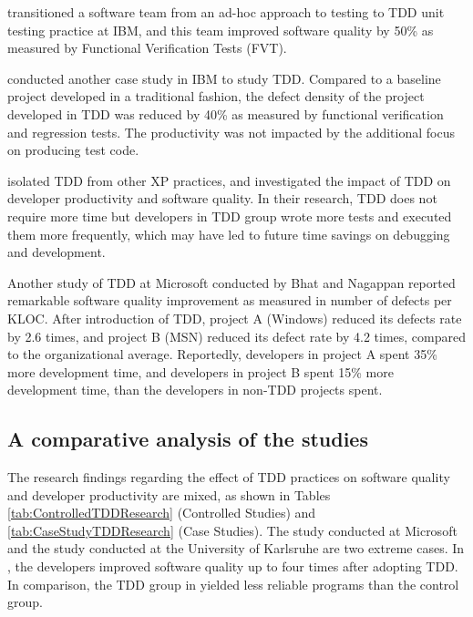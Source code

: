 \documentclass[smallextended]{svjour3}     %
\begin{document}
\cite{Maximilien:03} transitioned a software team
from an ad-hoc approach to testing to TDD unit testing practice at IBM, and
this team improved software quality by 50\% as measured by Functional
Verification Tests (FVT).

\cite{Williams:03} conducted another case
study in IBM to study TDD. Compared to a baseline project developed in a 
traditional fashion, the defect density of the project developed 
in TDD was reduced by 40\% as measured by functional verification and 
regression tests. The productivity was not impacted by the additional 
focus on producing test code. 

\cite{Geras:04} isolated TDD from other XP
practices, and investigated the impact of TDD on developer productivity and
software quality. In their research, TDD does not require more time but
developers in TDD group wrote more tests and executed them more frequently,
which may have led to future time savings on debugging and development.

Another study of TDD at Microsoft conducted by Bhat and Nagappan
\citep{Bhat:06} reported remarkable software quality improvement as 
measured in number of defects per KLOC. After introduction of TDD, 
project A (Windows) reduced its defects rate by 2.6 times, and project 
B (MSN) reduced its defect rate by 4.2 times, compared to the organizational
average. Reportedly, developers in project A spent 35\% more development
time, and developers in project B spent 15\% more development time, than
the developers in non-TDD projects spent.

\subsection{A comparative analysis of the studies}

The research findings regarding the effect of TDD practices on software quality 
and developer productivity are mixed,  as shown in 
Tables \ref{tab:ControlledTDDResearch} (Controlled Studies) and \ref{tab:CaseStudyTDDResearch} (Case Studies). 
The study conducted at Microsoft \citep{Bhat:06} and the study conducted 
at the University of Karlsruhe \citep{Muller:02} are two extreme cases. In 
\cite{Bhat:06}, the developers improved software quality up to four 
times after adopting TDD. In comparison, the TDD group in \cite{Muller:02} 
yielded less reliable programs than the control group. 
\end{document}
